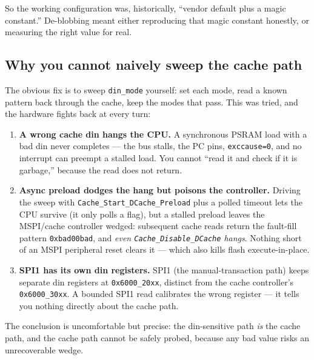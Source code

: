 
So the working configuration was, historically, ``vendor default plus a magic
constant.'' De-blobbing meant either reproducing that magic constant honestly, or
measuring the right value for real.

\subsection{Why you cannot naively sweep the cache path}

The obvious fix is to sweep \texttt{din\_mode} yourself: set each mode, read a known
pattern back through the cache, keep the modes that pass. This was tried, and the
hardware fights back at every turn:

\begin{enumerate}
\item \textbf{A wrong cache din hangs the CPU.} A synchronous PSRAM load with a bad
din never completes --- the bus stalls, the PC pins, \texttt{exccause=0}, and no
interrupt can preempt a stalled load. You cannot ``read it and check if it is
garbage,'' because the read does not return.
\item \textbf{Async preload dodges the hang but poisons the controller.} Driving the
sweep with \texttt{Cache\_Start\_DCache\_Preload} plus a polled timeout lets the CPU
survive (it only polls a flag), but a stalled preload leaves the MSPI/cache
controller wedged: subsequent cache reads return the fault-fill pattern
\texttt{0xbad00bad}, and \emph{even \texttt{Cache\_Disable\_DCache} hangs}. Nothing
short of an MSPI peripheral reset clears it --- which also kills flash execute-in-place.
\item \textbf{SPI1 has its own din registers.} SPI1 (the manual-transaction path) keeps
separate din registers at \texttt{0x6000\_20xx}, distinct from the cache controller's
\texttt{0x6000\_30xx}. A bounded SPI1 read calibrates the wrong register --- it tells
you nothing directly about the cache path.
\end{enumerate}

The conclusion is uncomfortable but precise: the din-sensitive path \emph{is} the
cache path, and the cache path cannot be safely probed, because any bad value risks an
unrecoverable wedge.

